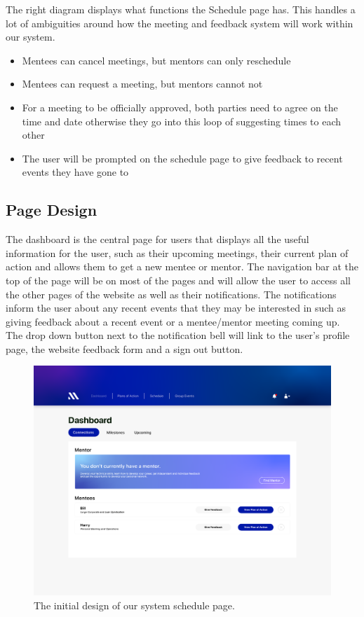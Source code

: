 \documentclass[10pt]{article}
\begin{document}
The right diagram displays what functions the Schedule page has. This handles a
lot of ambiguities around how the meeting and feedback system will work within
our system.
\begin{itemize}[leftmargin=1.2cm,noitemsep,align=left]
    \item Mentees can cancel meetings, but mentors can only reschedule
    \item Mentees can request a meeting, but mentors cannot not
    \item For a meeting to be officially approved, both parties need to agree on
    the time and date otherwise they go into this loop of suggesting times to
    each other
    \item The user will be prompted on the schedule page to give feedback to recent events they have gone to
\end{itemize}

\pagebreak

\subsection{Page Design}

The dashboard is the central page for users that displays all the useful
information for the user, such as their upcoming meetings, their current plan of
action and allows them to get a new mentee or mentor. The navigation bar at the
top of the page will be on most of the pages and will allow the user to access
all the other pages of the website as well as their notifications. The
notifications inform the user about any recent events that they may be
interested in such as giving feedback about a recent event or a mentee/mentor
meeting coming up. The drop down button next to the notification bell will link
to the user's profile page, the website feedback form and a sign out button.

\begin{figure}[H]
    \centering
    \includegraphics[width=0.48 \textwidth]{Dashboard}
    \caption{The initial design of our system schedule page.}
    \label{fig:dashboard}
\end{figure}
\end{document}
